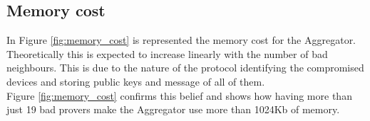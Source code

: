 \subsection{Memory cost}
In Figure \ref{fig:memory_cost} is represented the memory cost for the Aggregator.
Theoretically this is expected to increase linearly with the number of bad neighbours. This is due to the nature of the protocol identifying the compromised devices and storing public keys and message of all of them.\\
Figure \ref{fig:memory_cost} confirms this belief and shows how having more than just 19 bad provers make the Aggregator use more than 1024Kb of memory.\\


